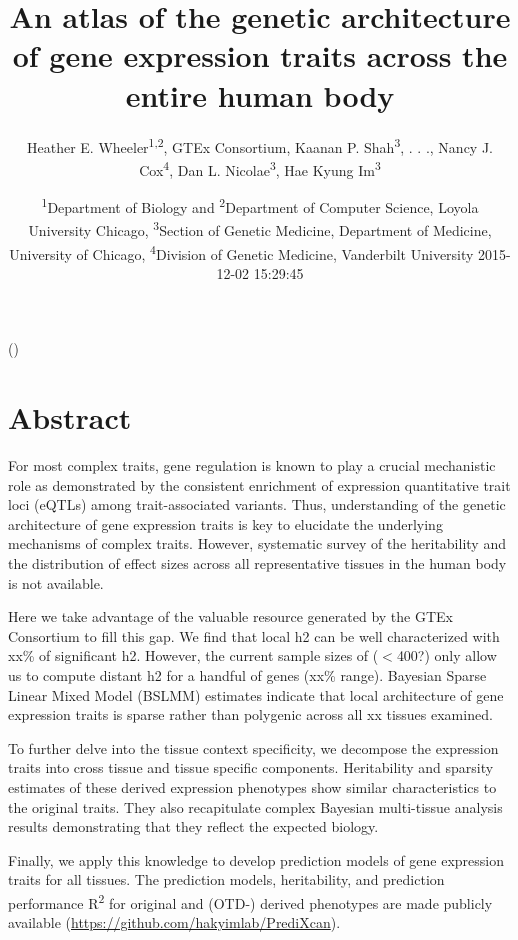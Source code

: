 \documentclass[]{article}
\title{An atlas of the genetic architecture of gene expression traits across
the entire human body}
\author{Heather E. Wheeler\textsuperscript{1,2}, GTEx Consortium, Kaanan P.
Shah\textsuperscript{3}, . . ., Nancy J. Cox\textsuperscript{4}, Dan L.
Nicolae\textsuperscript{3}, Hae Kyung Im\textsuperscript{3}}
\date{\textsuperscript{1}Department of Biology and
\textsuperscript{2}Department of Computer Science, Loyola University
Chicago, \textsuperscript{3}Section of Genetic Medicine, Department of
Medicine, University of Chicago, \textsuperscript{4}Division of Genetic
Medicine, Vanderbilt University 2015-12-02 15:29:45}
\begin{document}
\maketitle
\newpage()

\section{Abstract}\label{abstract}

For most complex traits, gene regulation is known to play a crucial mechanistic role as demonstrated by the consistent enrichment of expression quantitative trait loci (eQTLs) among trait-associated variants. Thus, understanding of the genetic architecture of gene expression traits is key to elucidate the underlying mechanisms of complex traits. However, systematic survey of the heritability and the distribution of effect sizes across all representative tissues in the human body is not available.

Here we take advantage of the valuable resource generated by the GTEx Consortium to fill this gap. We find that local h2 can be well characterized with xx\% of significant h2. However, the current sample sizes of ($<$400?) only allow us to compute distant h2 for a handful of genes (xx\% range). Bayesian Sparse Linear Mixed Model (BSLMM) estimates indicate that local architecture of gene expression traits is sparse rather than polygenic across all xx tissues examined.

To further delve into the tissue context specificity, we decompose the expression traits into cross tissue and tissue specific components. Heritability and sparsity estimates of these derived expression phenotypes show similar characteristics to the original traits. They also recapitulate complex Bayesian multi-tissue analysis results demonstrating that they reflect the expected biology. 

Finally, we apply this knowledge to develop prediction models of gene
expression traits for all tissues. The prediction models, heritability, and prediction performance R\textsuperscript{2} for original and (OTD-) derived phenotypes are made publicly available (\url{https://github.com/hakyimlab/PrediXcan}).


\end{document}
